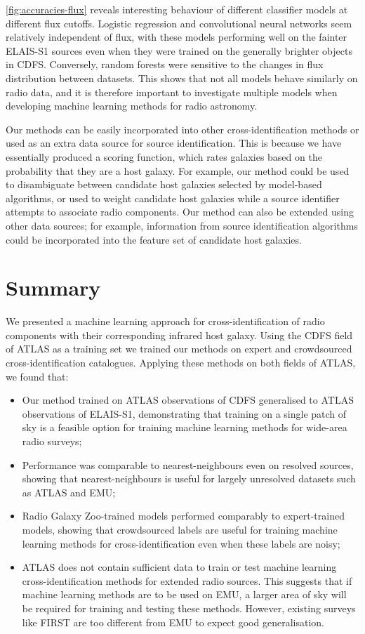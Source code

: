 \documentclass[fleqn,usenatbib,usedcolumn]{mnras}
\begin{document}
  \autoref{fig:accuracies-flux} reveals interesting behaviour of different
  classifier models at different flux cutoffs. Logistic regression and
  convolutional neural networks seem relatively independent of flux, with
  these models performing well on the fainter ELAIS-S1 sources even when
  they were trained on the generally brighter objects in CDFS. Conversely,
  random forests were sensitive to the changes in flux distribution between
  datasets. This shows that not all models behave similarly on radio data,
  and it is therefore important to investigate multiple models when
  developing machine learning methods for radio astronomy.

  Our methods can be easily incorporated into other cross-identification
  methods or used as an extra data source for source identification. This is
  because we have essentially produced a scoring function, which rates
  galaxies based on the probability that they are a host galaxy. For
  example, our method could be used to disambiguate between candidate host
  galaxies selected by model-based algorithms, or used to weight candidate
  host galaxies while a source identifier attempts to associate radio
  components. Our method can also be extended using other data sources; for
  example, information from source identification algorithms could be
  incorporated into the feature set of candidate host galaxies.

\section{Summary}

  We presented a machine learning approach for cross-identification of radio
  components with their corresponding infrared host galaxy. Using the CDFS field of ATLAS as a training set we trained our
  methods on expert and crowdsourced cross-identification catalogues. Applying these methods on both fields of ATLAS, we found that:
  \begin{itemize}
    \item Our method trained on ATLAS observations of CDFS generalised to ATLAS observations of ELAIS-S1, demonstrating that training on a single patch of sky is a feasible option for training machine learning methods for wide-area radio surveys;
    \item Performance was comparable to nearest-neighbours even on resolved sources, showing that nearest-neighbours is useful for largely unresolved datasets such as ATLAS and EMU;
    \item Radio Galaxy Zoo-trained models performed comparably to expert-trained models, showing that crowdsourced labels are useful for training machine learning methods for cross-identification even when these labels are noisy;
    \item ATLAS does not contain sufficient data to train or test machine learning cross-identification methods for extended radio sources. This suggests that if machine learning methods are to be used on EMU, a larger area of sky will be required for training and testing these methods. However, existing surveys like FIRST are too different from EMU to expect good generalisation.
  \end{itemize}
\end{document}
